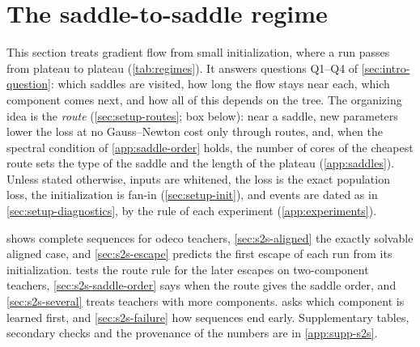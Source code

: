 
\section{The saddle-to-saddle regime}\label{sec:s2s}

This section treats gradient flow from small initialization, where a run passes from plateau to plateau
(\cref{tab:regimes}). It answers questions Q1--Q4 of \cref{sec:intro-question}: which saddles are
visited, how long the flow stays near each, which component comes next, and how all of this depends on
the tree. The organizing idea is the \emph{route} (\cref{sec:setup-routes}; box below): near a saddle,
new parameters lower the loss at no Gauss--Newton cost only through routes, and, when the spectral
condition of \cref{app:saddle-order} holds, the number of cores of the cheapest route sets the type of the
saddle and the length of the plateau \derived{} (\cref{app:saddles}). Unless stated otherwise, inputs are whitened, the loss is the exact population
loss, the initialization is fan-in (\cref{sec:setup-init}), and events are dated as in
\cref{sec:setup-diagnostics}, by the rule of each experiment (\cref{app:experiments}).

 shows complete sequences for odeco teachers, \cref{sec:s2s-aligned} the
exactly solvable aligned case, and \cref{sec:s2s-escape} predicts the first escape of each run from its
initialization.  tests the route rule for the later escapes on two-component
teachers, \cref{sec:s2s-saddle-order} says when the route gives the saddle order, and
\cref{sec:s2s-several} treats teachers with more components.  asks which component is
learned first, and \cref{sec:s2s-failure} how sequences end early. Supplementary tables, secondary checks
and the provenance of the numbers are in \cref{app:supp-s2s}.

